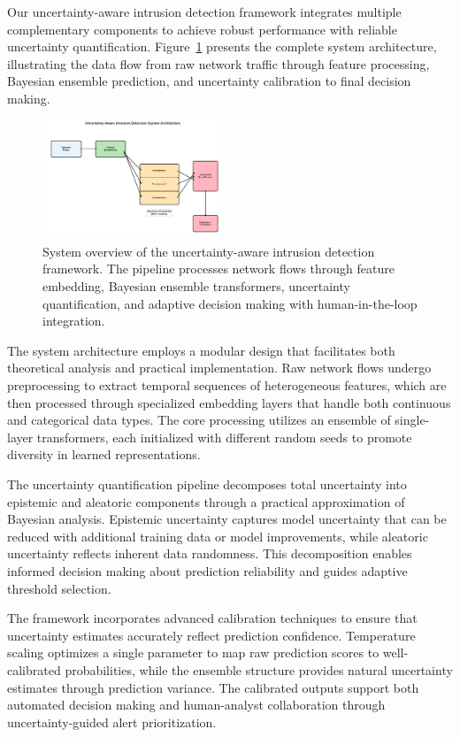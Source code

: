\documentclass[journal]{IEEEtran}
\begin{document}
Our uncertainty-aware intrusion detection framework integrates multiple complementary components to achieve robust performance with reliable uncertainty quantification. Figure~\ref{fig:system_overview} presents the complete system architecture, illustrating the data flow from raw network traffic through feature processing, Bayesian ensemble prediction, and uncertainty calibration to final decision making.

\begin{figure}[t]
\centering
\includegraphics[width=0.48\textwidth]{figures/system_overview.pdf} 
\caption{System overview of the uncertainty-aware intrusion detection framework. The pipeline processes network flows through feature embedding, Bayesian ensemble transformers, uncertainty quantification, and adaptive decision making with human-in-the-loop integration.}
\label{fig:system_overview}
\end{figure}

The system architecture employs a modular design that facilitates both theoretical analysis and practical implementation. Raw network flows undergo preprocessing to extract temporal sequences of heterogeneous features, which are then processed through specialized embedding layers that handle both continuous and categorical data types. The core processing utilizes an ensemble of single-layer transformers, each initialized with different random seeds to promote diversity in learned representations.

The uncertainty quantification pipeline decomposes total uncertainty into epistemic and aleatoric components through a practical approximation of Bayesian analysis. Epistemic uncertainty captures model uncertainty that can be reduced with additional training data or model improvements, while aleatoric uncertainty reflects inherent data randomness. This decomposition enables informed decision making about prediction reliability and guides adaptive threshold selection.

The framework incorporates advanced calibration techniques to ensure that uncertainty estimates accurately reflect prediction confidence. Temperature scaling optimizes a single parameter to map raw prediction scores to well-calibrated probabilities, while the ensemble structure provides natural uncertainty estimates through prediction variance. The calibrated outputs support both automated decision making and human-analyst collaboration through uncertainty-guided alert prioritization.
\end{document}
